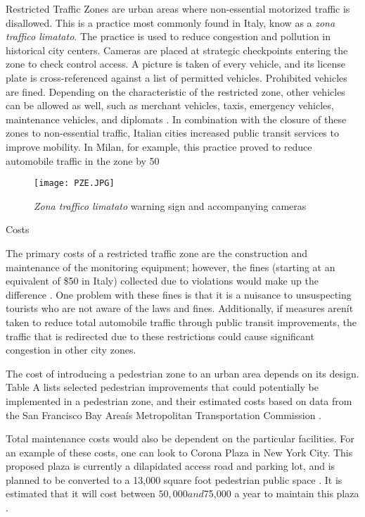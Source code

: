 Restricted Traffic Zones are urban areas where non-essential motorized traffic is disallowed. This is a practice most commonly found in Italy, know as a \emph{zona traffico limatato}. The practice is used to reduce congestion and pollution in historical city centers. Cameras are placed at strategic checkpoints entering the zone to check control access. A picture is taken of every vehicle, and its license plate is cross-referenced against a list of permitted vehicles. Prohibited vehicles are fined. Depending on the characteristic of the restricted zone, other vehicles can be allowed as well, such as merchant vehicles, taxis, emergency vehicles, maintenance vehicles, and diplomats \cite{PZ1}. In combination with the closure of these zones to non-essential traffic, Italian cities increased public transit services to improve mobility. In Milan, for example, this practice proved to reduce automobile traffic in the zone by 50%
 
\begin{figure}[h]
\centering
\texttt{[image: PZE.JPG]}
\caption[\emph{Zona traffico limatato} warning sign and accompanying cameras]{\emph{Zona traffico limatato} warning sign and accompanying cameras}\label{fig:PZE}
\end{figure}

Costs

The primary costs of a restricted traffic zone are the construction and maintenance of the monitoring equipment; however, the fines (starting at an equivalent of \$50 in Italy) collected due to violations would make up the difference \cite{PZ1}. One problem with these fines is that it is a nuisance to unsuspecting tourists who are not aware of the laws and fines. Additionally, if measures arenít taken to reduce total automobile traffic through public transit improvements, the traffic that is redirected due to these restrictions could cause significant congestion in other city zones.

The cost of introducing a pedestrian zone to an urban area depends on its design. Table A lists selected pedestrian improvements that could potentially be implemented in a pedestrian zone, and their estimated costs based on data from the San Francisco Bay Areaís Metropolitan Transportation Commission \cite{PZ8}.

 
Total maintenance costs would also be dependent on the particular facilities. For an example of these costs, one can look to Corona Plaza in New York City. This proposed plaza is currently a dilapidated access road and parking lot, and is planned to be converted to a 13,000 square foot pedestrian public space \cite{PZ10}. It is estimated that it will cost between $50,000 and $75,000 a year to maintain this plaza \cite{PZ11}.
